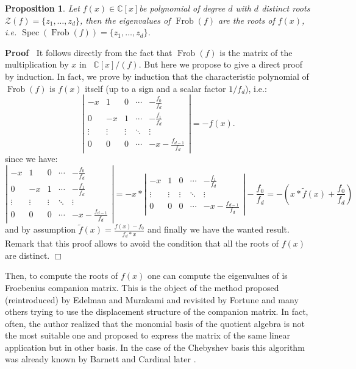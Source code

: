\documentclass{article}
\newcommand{\tmop}[1]{\ensuremath{\operatorname{#1}}}
\newenvironment{proof}{\noindent\textbf{Proof\ }}{\hspace*{\fill}$\Box$\medskip}
\newtheorem{proposition}{Proposition}
\begin{document}
\begin{proposition}
  Let $f (x) \in \mathbb{C}[x]$be polynomial of degree $d$ with $d$ distinct
  roots $\mathcal{Z}(f) =\{z_1, \ldots, z_d \}$, then the eigenvalues of
  $\tmop{Frob} (f)$ are the roots of $f (x)$, i.e. $\tmop{Spec} (\tmop{Frob}
  (f)) =\{z_1, \ldots, z_d \}$. \ 
\end{proposition}

\begin{proof}
  It follows directly from the fact that $\tmop{Frob} (f)$ is the matrix of
  the multiplication by $x$ in \ $\mathbb{C}[x] / (f)$. But here we propose
  to give a direct proof by induction. In fact, we prove by induction that the
  characteristic polynomial of $\tmop{Frob} (f)$ is $f (x)$ itself (up to a
  sign and a scalar factor $1 / f_d$), i.e.:
  \[ \left|\begin{array}{ccccc}
       - x & 1 & 0 & \cdots & - \frac{f_0}{f_d}\\
       0 & - x & 1 & \cdots & - \frac{f_1}{f_d}\\
       \vdots & \vdots & \vdots & \ddots & \vdots\\
       0 & 0 & 0 & \cdots & - x - \frac{f_{d - 1}}{f_d}
     \end{array}\right| = - f (x) . \]
  since we have:
  \[ \left|\begin{array}{ccccc}
       - x & 1 & 0 & \cdots & - \frac{f_0}{f_d}\\
       0 & - x & 1 & \cdots & - \frac{f_1}{f_d}\\
       \vdots & \vdots & \vdots & \ddots & \vdots\\
       0 & 0 & 0 & \cdots & - x - \frac{f_{d - 1}}{f_d}
     \end{array}\right| = - x \ast \left|\begin{array}{ccccc}
       - x & 1 & 0 & \cdots & - \frac{f_1}{f_d}\\
       \vdots & \vdots & \vdots & \ddots & \vdots\\
       0 & 0 & 0 & \cdots & - x - \frac{f_{d - 1}}{f_d}
     \end{array}\right| - \frac{f_0}{f_d} = - (x \ast \tilde{f} (x) +
     \frac{f_0}{f_d}) \]
  and by assumption $\tilde{f} (x) = \frac{f (x) - f_0}{f_d \ast x}$ and
  finally we have the wanted result. Remark that this proof allows to avoid
  the condition that all the roots of $f (x)$ are distinct.
\end{proof}

Then, to compute the roots of $f (x)$ one can compute the eigenvalues of is
Froebenius companion matrix. This is the object of the method proposed
(reintroduced) by Edelman and Murakami {\cite{EM}} and revisited by Fortune
{\cite{F}} and many others trying to use the displacement structure of the
companion matrix. In fact, often, the author realized that the monomial basis
of the quotient algebra is not the most suitable one and proposed to express
the matrix of the same linear application but in other basis. In the case of
the Chebyshev basis this algorithm was already known by Barnett {\cite{B}} and
Cardinal later {\cite{C}}.
\end{document}
